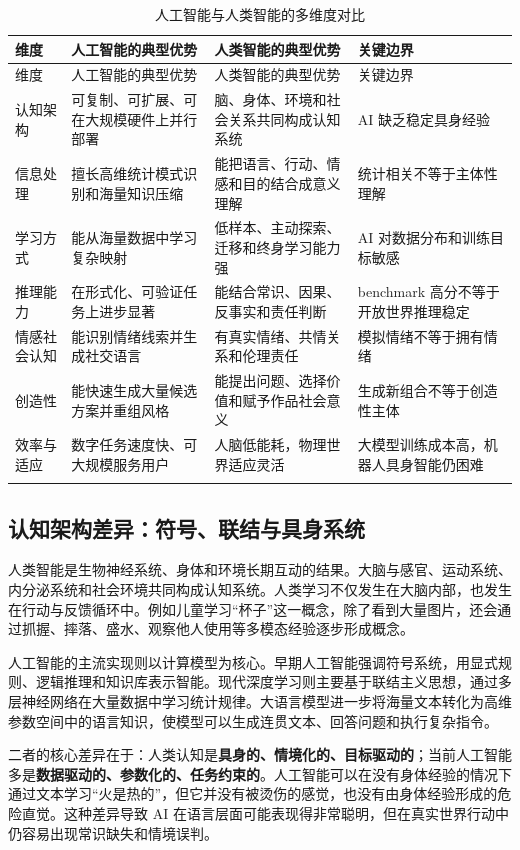 \documentclass[UTF8,zihao=5,a4paper]{ctexart}
\begin{document}
\begin{longtable}{p{2.6cm}p{4.0cm}p{4.0cm}p{3.2cm}}
\toprule
维度 & 人工智能的典型优势 & 人类智能的典型优势 & 关键边界 \\
\midrule
\endfirsthead
\toprule
维度 & 人工智能的典型优势 & 人类智能的典型优势 & 关键边界 \\
\midrule
\endhead
认知架构 & 可复制、可扩展、可在大规模硬件上并行部署 & 脑、身体、环境和社会关系共同构成认知系统 & AI 缺乏稳定具身经验 \\
信息处理 & 擅长高维统计模式识别和海量知识压缩 & 能把语言、行动、情感和目的结合成意义理解 & 统计相关不等于主体性理解 \\
学习方式 & 能从海量数据中学习复杂映射 & 低样本、主动探索、迁移和终身学习能力强 & AI 对数据分布和训练目标敏感 \\
推理能力 & 在形式化、可验证任务上进步显著 & 能结合常识、因果、反事实和责任判断 & benchmark 高分不等于开放世界推理稳定 \\
情感社会认知 & 能识别情绪线索并生成社交语言 & 有真实情绪、共情关系和伦理责任 & 模拟情绪不等于拥有情绪 \\
创造性 & 能快速生成大量候选方案并重组风格 & 能提出问题、选择价值和赋予作品社会意义 & 生成新组合不等于创造性主体 \\
效率与适应 & 数字任务速度快、可大规模服务用户 & 人脑低能耗，物理世界适应灵活 & 大模型训练成本高，机器人具身智能仍困难 \\
\bottomrule
\caption{人工智能与人类智能的多维度对比}
\label{tab:ai_human_compare}\\
\end{longtable}

\subsection{认知架构差异：符号、联结与具身系统}

人类智能是生物神经系统、身体和环境长期互动的结果。大脑与感官、运动系统、内分泌系统和社会环境共同构成认知系统。人类学习不仅发生在大脑内部，也发生在行动与反馈循环中。例如儿童学习“杯子”这一概念，除了看到大量图片，还会通过抓握、摔落、盛水、观察他人使用等多模态经验逐步形成概念。

人工智能的主流实现则以计算模型为核心。早期人工智能强调符号系统，用显式规则、逻辑推理和知识库表示智能。现代深度学习则主要基于联结主义思想，通过多层神经网络在大量数据中学习统计规律。大语言模型进一步将海量文本转化为高维参数空间中的语言知识，使模型可以生成连贯文本、回答问题和执行复杂指令。

二者的核心差异在于：人类认知是\textbf{具身的、情境化的、目标驱动的}；当前人工智能多是\textbf{数据驱动的、参数化的、任务约束的}。人工智能可以在没有身体经验的情况下通过文本学习“火是热的”，但它并没有被烫伤的感觉，也没有由身体经验形成的危险直觉。这种差异导致 AI 在语言层面可能表现得非常聪明，但在真实世界行动中仍容易出现常识缺失和情境误判。
\end{document}
